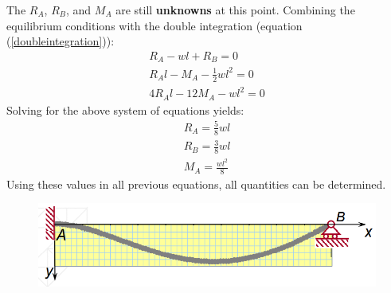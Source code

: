\documentclass[class=report, crop=false, 12pt,a4paper]{standalone}
\begin{document}
The $R_A$, $R_B$, and $M_A$ are still \textbf{unknowns} at this point. Combining the equilibrium conditions with the double integration (equation (\ref{doubleintegration})):
\begin{gather}
  R_A-wl+R_B = 0 \\
  R_Al-M_A-\frac{1}{2}wl^2 = 0 \\
  4R_Al-12M_A-wl^2 = 0 
\end{gather}
Solving for the above system of equations yields:
\begin{gather}
  R_A = \frac{5}{8}wl \\
  R_B = \frac{3}{8}wl \\
  M_A = \frac{wl^2}{8}
\end{gather}
Using these values in all previous equations, all quantities can be determined.
\begin{figure}[H]
  \centering
  \includegraphics[width = 0.9 \textwidth]{../img/graph1.PNG}
\end{figure}
\end{document}

